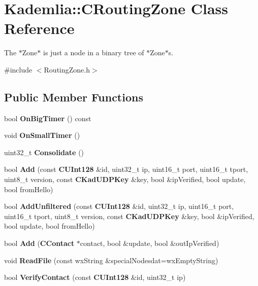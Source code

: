 \section{Kademlia::CRoutingZone Class Reference}
\label{classKademlia_1_1CRoutingZone}


The $\ast$Zone$\ast$ is just a node in a binary tree of $\ast$Zone$\ast$s.  


{\ttfamily \#include $<$RoutingZone.h$>$}\subsection*{Public Member Functions}
\begin{DoxyCompactItemize}
\item 
bool {\bfseries OnBigTimer} () const \label{classKademlia_1_1CRoutingZone_a044863778f0875ffa939e368447cfbed}

\item 
void {\bfseries OnSmallTimer} ()\label{classKademlia_1_1CRoutingZone_a1131dfba89dbb05158c3c2249d2e8ee4}

\item 
uint32\_\-t {\bfseries Consolidate} ()\label{classKademlia_1_1CRoutingZone_af0ee210c2a1ff7af0bc7d6d54edf9e1f}

\item 
bool {\bfseries Add} (const {\bf CUInt128} \&id, uint32\_\-t ip, uint16\_\-t port, uint16\_\-t tport, uint8\_\-t version, const {\bf CKadUDPKey} \&key, bool \&ipVerified, bool update, bool fromHello)\label{classKademlia_1_1CRoutingZone_a2ddf9eb4e1a2344ff6797bb2cad02ef1}

\item 
bool {\bfseries AddUnfiltered} (const {\bf CUInt128} \&id, uint32\_\-t ip, uint16\_\-t port, uint16\_\-t tport, uint8\_\-t version, const {\bf CKadUDPKey} \&key, bool \&ipVerified, bool update, bool fromHello)\label{classKademlia_1_1CRoutingZone_aee1627ebeb03517232308053571de2bb}

\item 
bool {\bfseries Add} ({\bf CContact} $\ast$contact, bool \&update, bool \&outIpVerified)\label{classKademlia_1_1CRoutingZone_ade3f2d86012cfb3ecb1acf41bb87a7dd}

\item 
void {\bfseries ReadFile} (const wxString \&specialNodesdat=wxEmptyString)\label{classKademlia_1_1CRoutingZone_a16d1978811cc28c68a8b2a03ed2372b4}

\item 
bool {\bfseries VerifyContact} (const {\bf CUInt128} \&id, uint32\_\-t ip)\label{classKademlia_1_1CRoutingZone_a973f9be05b334110f1a44dc7519537b2}


\end{DoxyCompactItemize}
